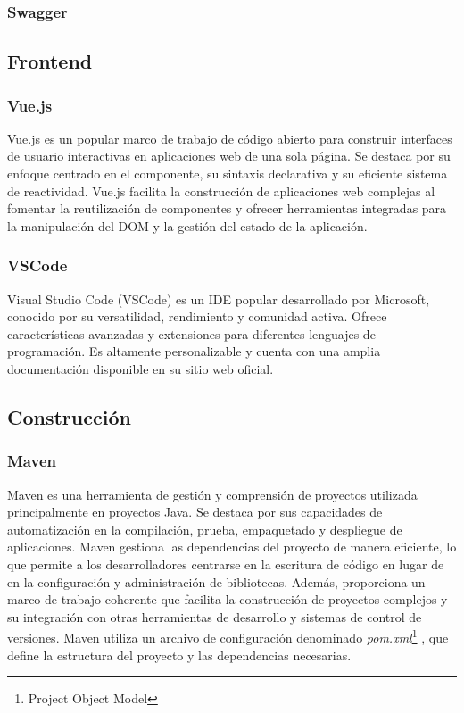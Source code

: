 \subsubsection{Swagger}


\subsection{Frontend}

\subsubsection{Vue.js}
Vue.js\cite{vue} es un popular marco de trabajo de código abierto para construir interfaces de usuario interactivas en aplicaciones web de una sola página.
Se destaca por su enfoque centrado en el componente, su sintaxis declarativa y su eficiente sistema de reactividad. Vue.js facilita la construcción
de aplicaciones web complejas al fomentar la reutilización de componentes y ofrecer herramientas integradas para la manipulación del DOM y la gestión
del estado de la aplicación.

\subsubsection{VSCode}
Visual Studio Code (VSCode) es un IDE popular desarrollado por Microsoft, conocido por su versatilidad, rendimiento y comunidad activa.
Ofrece características avanzadas y extensiones para diferentes lenguajes de programación. Es altamente personalizable y cuenta con una
amplia documentación disponible en su sitio web oficial.

\subsection{Construcción}

\subsubsection{Maven}
Maven es una herramienta de gestión y comprensión de proyectos utilizada principalmente en proyectos Java. Se destaca por sus capacidades de automatización
en la compilación, prueba, empaquetado y despliegue de aplicaciones. Maven gestiona las dependencias del proyecto de manera eficiente, lo que permite a los
desarrolladores centrarse en la escritura de código en lugar de en la configuración y administración de bibliotecas. Además, proporciona un marco de trabajo
coherente que facilita la construcción de proyectos complejos y su integración con otras herramientas de desarrollo y sistemas de control de versiones. Maven
utiliza un archivo de configuración denominado \textit{pom.xml}\footnote{Project Object Model} , que define la estructura del proyecto y las dependencias necesarias.

